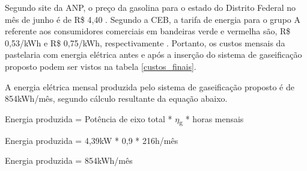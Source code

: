 Segundo site da ANP, o preço da gasolina para o estado do Distrito Federal no mês de junho é de R\$ 4,40 \cite{anp}. Segundo a CEB, a tarifa de energia para o grupo A referente aos consumidores comerciais em bandeiras verde e vermelha são, R\$ 0,53/kWh e R\$ 0,75/kWh, respectivamente \cite{ceb}. Portanto, os custos mensais da pastelaria com energia elétrica antes e após a inserção do sistema de gaseificação proposto podem ser vistos na tabela \ref{custos_finais}.

A energia elétrica mensal produzida pelo sistema de gaseificação proposto é de 854kWh/mês, segundo cálculo resultante da equação abaixo.

\begin{center}
	Energia produzida = Potência de eixo total * $\eta$\textsubscript{g} * horas mensais
	
	Energia produzida = 4,39kW * 0,9 * 216h/mês
	
	Energia produzida = 854kWh/mês
	
\end{center}



